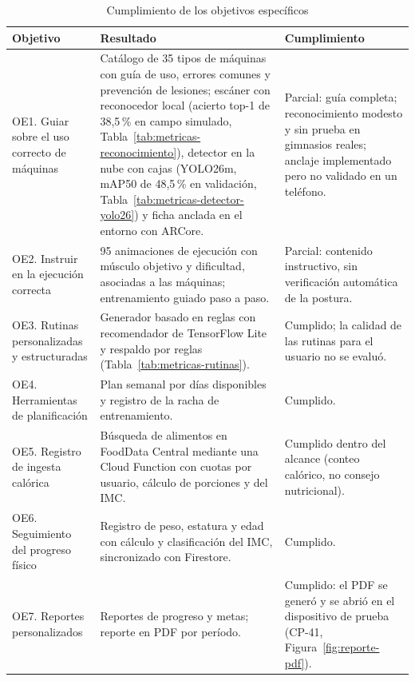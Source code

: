 \begin{table}[H]
\centering
\caption{Cumplimiento de los objetivos específicos}
\label{tab:res-objetivos}
\small
\begin{tabularx}{\textwidth}{|L{2.9cm}|Y|L{3.5cm}|}
\hline
{} \textbf{Objetivo} & \textbf{Resultado} & \textbf{Cumplimiento} \\
\hline
OE1. Guiar sobre el uso correcto de máquinas &
Catálogo de 35 tipos de máquinas con guía de uso, errores comunes y
prevención de lesiones; escáner con reconocedor local (acierto top-1 de 38,5\,\%
en campo simulado, Tabla~\ref{tab:metricas-reconocimiento}), detector en la
nube con cajas (YOLO26m, mAP50 de 48,5\,\% en validación, Tabla~\ref{tab:metricas-detector-yolo26}) y ficha anclada en el entorno con ARCore. &
Parcial: guía completa; reconocimiento modesto y sin prueba en gimnasios
reales; anclaje implementado pero no validado en un teléfono. \\ \hline
OE2. Instruir en la ejecución correcta &
95 animaciones de ejecución con músculo objetivo y dificultad, asociadas a las
máquinas; entrenamiento guiado paso a paso. &
Parcial: contenido instructivo, sin verificación automática de la postura. \\ \hline
OE3. Rutinas personalizadas y estructuradas &
Generador basado en reglas con recomendador de TensorFlow Lite y respaldo por
reglas (Tabla~\ref{tab:metricas-rutinas}). &
Cumplido; la calidad de las rutinas para el usuario no se evaluó. \\ \hline
OE4. Herramientas de planificación &
Plan semanal por días disponibles y registro de la racha de entrenamiento. &
Cumplido. \\ \hline
OE5. Registro de ingesta calórica &
Búsqueda de alimentos en FoodData Central mediante una Cloud Function con
cuotas por usuario, cálculo de porciones y del IMC. &
Cumplido dentro del alcance (conteo calórico, no consejo nutricional). \\ \hline
OE6. Seguimiento del progreso físico &
Registro de peso, estatura y edad con cálculo y clasificación del IMC,
sincronizado con Firestore. & Cumplido. \\ \hline
OE7. Reportes personalizados &
Reportes de progreso y metas; reporte en PDF por período. &
Cumplido: el PDF se generó y se abrió en el dispositivo de prueba (CP-41,
Figura~\ref{fig:reporte-pdf}). \\
\hline
\end{tabularx}
\end{table}

